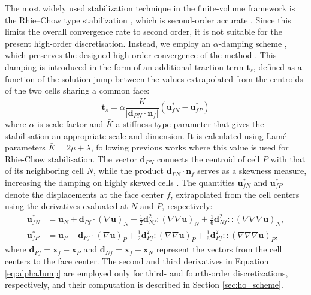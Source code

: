 \documentclass[sn-mathphys,Numbered]{sn-jnl}%
\newcommand{\bb}{\boldsymbol}
\begin{document}
The most widely used stabilization technique in the finite-volume framework is the Rhie–Chow type stabilization \cite{Rhie1983}, which is second-order accurate \cite{Cardiff2025}.
Since this limits the overall convergence rate to second order, it is not suitable for the present high-order discretisation.
Instead, we employ an $\alpha$-damping scheme \cite{Nishikawa2010}, which preserves the designed high-order convergence of the method \cite{ Nishikawa2011}.
This damping is introduced in the form of an additional traction term $\bb{t}_s$, defined as a function of the solution jump between the values extrapolated from the centroids of the two cells sharing a common face:
\begin{equation}
\bb{t}_s = \alpha \frac{\bar{K}}{|\bb{d}_{PN} \cdot \bb{n}_f|}(\bb{u}_{fN}^*-\bb{u}_{fP}^*)
\end{equation}
%
where $\alpha$ is scale factor and $\bar{K}$ a stiffness-type parameter that gives the stabilisation an appropriate scale and dimension.
It is calculated using Lamé parameters $\bar{K} = 2\mu +\lambda$, following previous works \cite{Tukovic2013,Cardiff2017,Cardiff2018} where this value is used for Rhie-Chow stabilisation. 
The vector $\bb{d}_{PN}$ connects the centroid of cell $P$ with that of its neighboring cell $N$, 
while the product $\bb{d}_{PN} \cdot \bb{n}_f$ serves as a skewness measure, increasing the damping on highly skewed cells \cite{Nishikawa2011}.
The quantities $\bb{u}_{fN}^*$ and $\bb{u}_{fP}^*$ denote the displacements at the face center $f$,
 extrapolated from the cell centers using the derivatives evaluated at $N$ and $P$, respectively:
\begin{equation}\label{eq:alphaJump}
\begin{split}
\bb{u}_{fN}^* &= \bb{u}_N + \bb{d}_{Pf} \cdot (\nabla \bb{u})_N + \frac{1}{2}\bb{d}_{Nf}^2 \!:\! (\nabla \nabla \bb{u})_N + \frac{1}{6}\bb{d}_{Nf}^2 \!::\! (\nabla \nabla \nabla \bb{u})_N, \\
\bb{u}_{fP}^*& = \bb{u}_P + \bb{d}_{Pf} \cdot (\nabla \bb{u})_P + \frac{1}{2}\bb{d}_{Pf}^2 \!:\! (\nabla \nabla \bb{u})_P + \frac{1}{6}\bb{d}_{Pf}^2 \!::\! (\nabla \nabla \nabla \bb{u})_P,
\end{split}
\end{equation}
where $\bb{d}_{Pf} = \bb{x}_f - \bb{x}_P$ and $\bb{d}_{Nf} = \bb{x}_f - \bb{x}_N$ represent the vectors from the cell centers to the face center.
The second and third derivatives in Equation \eqref{eq:alphaJump} are employed only for third- and fourth-order discretizations, respectively, and their computation is described in Section \ref{sec:ho_scheme}.
\end{document}
